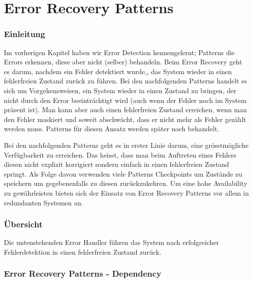 \section{Error Recovery Patterns}


\subsubsection*{Einleitung}


Im vorherigen Kapitel haben wir Error Detection kennengelernt; Patterns die Errors erkennen, diese aber nicht (selber) behandeln. Beim Error Recovery geht es darum, nachdem ein Fehler detektiert wurde,, das System wieder in einen fehlerfreien Zustand zurück zu führen. Bei den nachfolgenden Patterns handelt es sich um Vorgehensweisen, ein System wieder in einen Zustand zu bringen, der nicht durch den Error beeinträchtigt wird (auch wenn der Fehler noch im System präsent ist). Man kann aber auch einen fehlerfreien Zustand erreichen, wenn man den Fehler maskiert und soweit abschwächt, dass er nicht mehr als Fehler gezählt werden muss. Patterns für diesen Ansatz werden später noch behandelt.

Bei den nachfolgenden Patterns geht es in erster Linie darum, eine grösstmögliche Verfügbarkeit zu erreichen. Das heisst, dass man beim Auftreten eines Fehlers diesen nicht explizit korrigiert sondern einfach in einen fehlerfreien Zustand springt. Als Folge davon verwenden viele Patterns Checkpoints um Zustände zu speichern um gegebenenfalls zu diesen zurückzukehren. Um eine hohe Availability zu gewährleisten bieten sich der Einsatz von Error Recovery Patterns vor allem in redundanten Systemen an.

\subsubsection*{Übersicht}


Die untenstehenden Error Handler führen das System nach erfolgreicher Fehlerdetektion in einen fehlerfreien Zustand zurück.

\subsubsection*{Error Recovery Patterns - Dependency}

